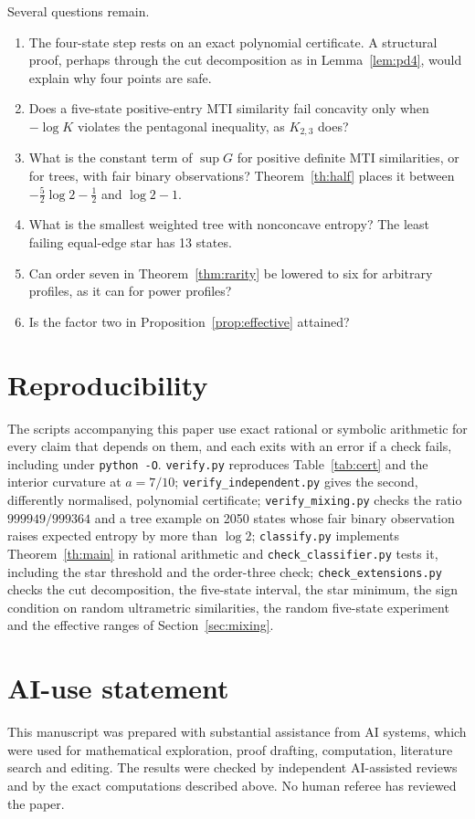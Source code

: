 \documentclass[11pt,a4paper]{article}
\theoremstyle{remark}
\begin{document}
Several questions remain.
\begin{enumerate}
\item The four-state step rests on an exact polynomial certificate. A structural proof, perhaps through the cut decomposition as in Lemma~\ref{lem:pd4}, would explain why four points are safe.
\item Does a five-state positive-entry MTI similarity fail concavity only when $-\log K$ violates the pentagonal inequality, as $K_{2,3}$ does?
\item What is the constant term of $\sup G$ for positive definite MTI similarities, or for trees, with fair binary observations? Theorem~\ref{th:half} places it between $-\tfrac52\log2-\tfrac12$ and $\log2-1$.
\item What is the smallest weighted tree with nonconcave entropy? The least failing equal-edge star has 13 states.
\item Can order seven in Theorem~\ref{thm:rarity} be lowered to six for arbitrary profiles, as it can for power profiles?
\item Is the factor two in Proposition~\ref{prop:effective} attained?
\end{enumerate}

\section*{Reproducibility}
The scripts accompanying this paper use exact rational or symbolic arithmetic for every claim that depends on them, and each exits with an error if a check fails, including under \texttt{python -O}. \texttt{verify.py} reproduces Table~\ref{tab:cert} and the interior curvature at $a=7/10$; \texttt{verify\_independent.py} gives the second, differently normalised, polynomial certificate; \texttt{verify\_mixing.py} checks the ratio $999949/999364$ and a tree example on 2050 states whose fair binary observation raises expected entropy by more than $\log 2$; \texttt{classify.py} implements Theorem~\ref{th:main} in rational arithmetic and \texttt{check\_classifier.py} tests it, including the star threshold and the order-three check; \texttt{check\_extensions.py} checks the cut decomposition, the five-state interval, the star minimum, the sign condition on random ultrametric similarities, the random five-state experiment and the effective ranges of Section~\ref{sec:mixing}.

\section*{AI-use statement}
This manuscript was prepared with substantial assistance from AI systems, which were used for mathematical exploration, proof drafting, computation, literature search and editing. The results were checked by independent AI-assisted reviews and by the exact computations described above. No human referee has reviewed the paper.
\end{document}
